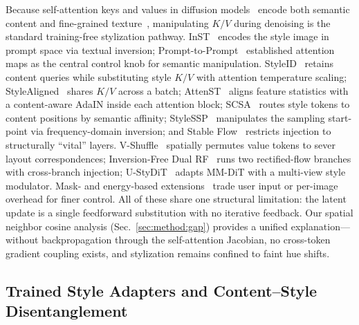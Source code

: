 Because self-attention keys and values in diffusion
models~\cite{ho2020denoising} encode both semantic content and
fine-grained texture~\cite{hertz2022prompt}, manipulating $K/V$ during
denoising is the standard training-free stylization pathway.
InST~\cite{zhang2023inst} encodes the style image in prompt space via textual
inversion; Prompt-to-Prompt~\cite{hertz2022prompt} established attention maps
as the central control knob for semantic manipulation.
StyleID~\cite{chung2024styleid} retains content queries while substituting
style $K/V$ with attention temperature scaling;
StyleAligned~\cite{hertz2024style} shares $K/V$ across a batch;
AttenST~\cite{attenst2025} aligns feature statistics with a content-aware
AdaIN inside each attention block; SCSA~\cite{scsa2025} routes style tokens to
content positions by semantic affinity; StyleSSP~\cite{xu2025stylessp}
manipulates the sampling start-point via frequency-domain inversion; and
Stable Flow~\cite{avrahami2025stableflow} restricts injection to structurally
``vital'' layers.
V-Shuffle~\cite{vshuffle2025} spatially permutes value tokens to sever layout
correspondences; Inversion-Free Dual RF~\cite{dualrf2025} runs two
rectified-flow branches with cross-branch injection;
U-StyDiT~\cite{ustydit2025} adapts MM-DiT with a multi-view style modulator.
Mask- and energy-based
extensions~\cite{mast2026,omnipainter2025,stylegallery2026} trade user input
or per-image overhead for finer control.
All of these share one structural limitation: the latent update is a single
feedforward substitution with no iterative feedback.
Our spatial neighbor cosine analysis (Sec.~\ref{sec:method:gap}) provides a
unified explanation---without backpropagation through the self-attention
Jacobian, no cross-token gradient coupling exists, and stylization remains
confined to faint hue shifts.

\subsection{Trained Style Adapters and Content--Style Disentanglement}

